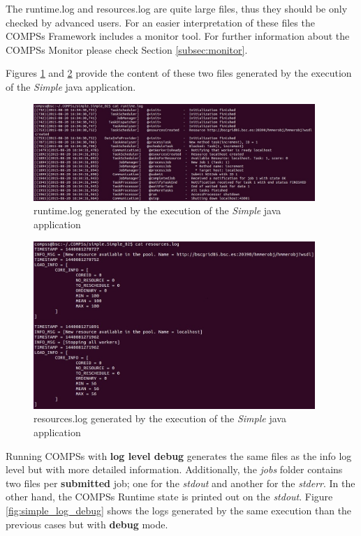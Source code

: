 The runtime.log and resources.log are quite large files, thus they should be only checked by advanced users. For an
easier interpretation of these files the COMPSs Framework includes a monitor tool. For further information about the COMPSs Monitor
please check Section \ref{subsec:monitor}.

Figures \ref{fig:simple_runtimelog} and \ref{fig:simple_resourceslog} provide the content of these two files generated
by the execution of the \textit{Simple} java application. 
\begin{figure}[h!]
  \centering
    \includegraphics[width=0.95\textwidth]{./Sections/3_Results_and_Logs/Figures/simple_runtimelog.jpeg}
    \caption{runtime.log generated by the execution of the \textit{Simple} java application}
    \label{fig:simple_runtimelog}
\end{figure}

\begin{figure}[h!]
  \centering
    \includegraphics[width=0.95\textwidth]{./Sections/3_Results_and_Logs/Figures/simple_resourceslog.jpeg}
    \caption{resources.log generated by the execution of the \textit{Simple} java application}
    \label{fig:simple_resourceslog}
\end{figure}

Running COMPSs with \textbf{log level debug} generates the same files as the info log level but with more detailed information.
Additionally, the \textit{jobs} folder contains two files per \textbf{submitted} job; one for the \textit{stdout} and another for
the \textit{stderr}. In the other hand, the COMPSs Runtime state is printed out on the \textit{stdout}. Figure 
\ref{fig:simple_log_debug} shows the logs generated by the same execution than the previous cases 
but with \textbf{debug} mode. 

